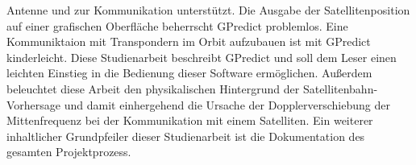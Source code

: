 Antenne und zur Kommunikation unterstützt. Die Ausgabe der Satellitenposition auf einer grafischen Oberfläche beherrscht GPredict problemlos. Eine 
Kommuniktaion mit Transpondern im Orbit aufzubauen ist mit GPredict kinderleicht.
\newpar
Diese Studienarbeit beschreibt GPredict und soll dem Leser einen 
leichten Einstieg in die Bedienung dieser Software ermöglichen. Außerdem beleuchtet diese Arbeit den physikalischen Hintergrund der 
Satellitenbahn-Vorhersage und damit einhergehend die Ursache der Dopplerverschiebung der Mittenfrequenz bei der Kommunikation mit einem Satelliten. 
Ein weiterer inhaltlicher Grundpfeiler dieser Studienarbeit ist die Dokumentation des gesamten Projektprozess. 

\clearpage
